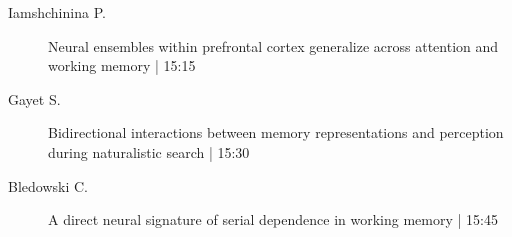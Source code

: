 \begin{symposium}
\begin{description}
                \item [ Iamshchinina P.] Neural ensembles within prefrontal cortex generalize across attention and working memory  \textcolor{mygray}{ | 15:15}    
                
                \item [ Gayet S.] Bidirectional interactions between memory representations and perception during naturalistic search \textcolor{mygray}{ | 15:30}    
                
                \item [ Bledowski C.] A direct neural signature of serial dependence in working memory \textcolor{mygray}{ | 15:45}    
                
            \end{description} 
            \end{symposium}
            